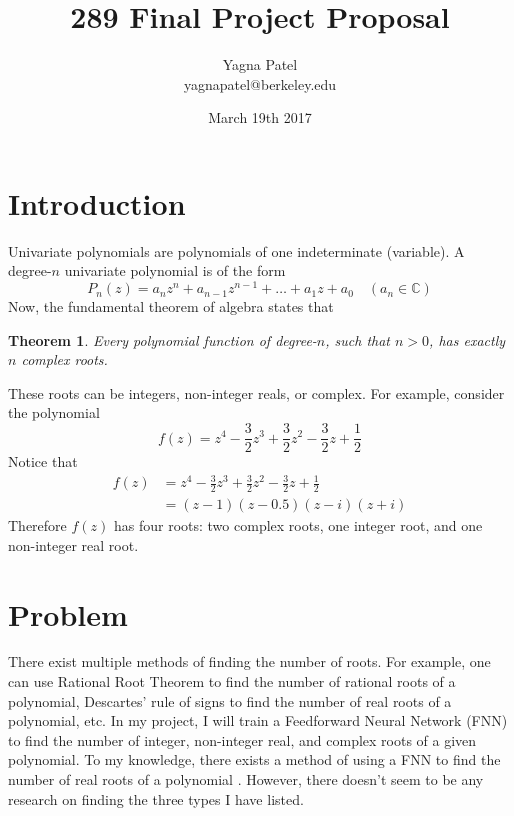 \documentclass{article}
\title{289 Final Project Proposal}
\author{Yagna Patel \\ yagnapatel@berkeley.edu}
\date{March 19th 2017}
\newtheorem{theorem}{Theorem}
\begin{document}
\maketitle

\section{Introduction}
Univariate polynomials are polynomials of one indeterminate (variable). A degree-$n$ univariate polynomial is of the form $$P_n(z) = a_nz^n + a_{n-1}z^{n-1} + \ldots + a_1z + a_0\quad (a_n\in\mathbb{C})$$ Now, the fundamental theorem of algebra states that \begin{theorem}Every polynomial function of degree-$n$, such that $n>0$, has exactly $n$ complex roots.\end{theorem} \noindent These roots can be integers, non-integer reals, or complex. For example, consider the polynomial $$f(z) = z^4-\frac{3}{2}z^3+\frac{3}{2}z^2-\frac{3}{2}z+\frac{1}{2}$$ Notice that \begin{align*}f(z) &= z^4-\frac{3}{2}z^3+\frac{3}{2}z^2-\frac{3}{2}z+\frac{1}{2} \\&= (z-1)(z-0.5)(z-i)(z+i)\end{align*} Therefore $f(z)$ has four roots: two complex roots, one integer root, and one non-integer real root.

\section{Problem}
There exist multiple methods of finding the number of roots. For example, one can use Rational Root Theorem to find the number of rational roots of a polynomial, Descartes' rule of signs to find the number of real roots of a polynomial, etc. In my project, I will train a Feedforward Neural Network (FNN) to find the number of integer, non-integer real, and complex roots of a given polynomial. To my knowledge, there exists a method of using a FNN to find the number of real roots of a polynomial \cite{real_roots}. However, there doesn't seem to be any research on finding the three types I have listed.
\end{document}
